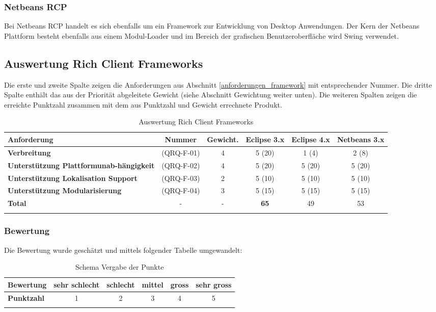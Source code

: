 \subsubsection{Netbeans RCP}
Bei Netbeans RCP handelt es sich ebenfalls um ein Framework zur Entwicklung von Desktop Anwendungen. Der Kern der Netbeans Plattform besteht ebenfalls aus einem Modul-Loader und im Bereich der grafischen Benutzeroberfläche wird Swing verwendet.

\subsection{Auswertung Rich Client Frameworks}
Die erste und zweite Spalte zeigen die Anforderungen aus Abschnitt \ref{anforderungen_framework} mit entsprechender Nummer. Die dritte Spalte enthält das aus der Priorität abgeleitete Gewicht (siehe Abschnitt Gewichtung weiter unten). Die weiteren Spalten zeigen die erreichte Punktzahl zusammen mit dem aus Punktzahl und Gewicht errechnete Produkt.
\begin{longtable}{|p{3cm}|c|c|c|c|c|}\hline
 \textbf{Anforderung} & \textbf{Nummer} &  \textbf{Gewicht.} & \textbf{Eclipse 3.x} & \textbf{Eclipse 4.x} &  \textbf{Netbeans 3.x}\\\hline
   \textbf{Verbreitung} & (QRQ-F-01) & 4 & 5 (20) & 1 (4) & 2 (8)\\\hline
   \textbf{Unterstützung Plattformunab-hängigkeit} & (QRQ-F-02) & 4 & 5 (20) & 5 (20) & 5 (20)\\\hline
   \textbf{Unterstützung Lokalisation Support} & (QRQ-F-03) & 2 & 5 (10) & 5 (10) & 5 (10) \\\hline
   \textbf{Unterstützung Modularisierung} & (QRQ-F-04) & 3 & 5 (15) & 5 (15) & 5 (15) \\\hline
   \textbf{Total} & - & - & \textbf{65} & 49 & 53\\\hline
    \caption{Auswertung Rich Client Frameworks}
\end{longtable}

\subsubsection{Bewertung}
Die Bewertung wurde geschätzt und mittels folgender Tabelle umgewandelt:\begin{longtable}{|l|c|c|c|c|c|}\hline
 \textbf{Bewertung} & sehr schlecht & schlecht & mittel & gross & sehr gross\\\hline
 \textbf{Punktzahl} & 1 & 2 & 3 & 4 & 5\\\hline
 \caption{Schema Vergabe der Punkte}
\end{longtable}

